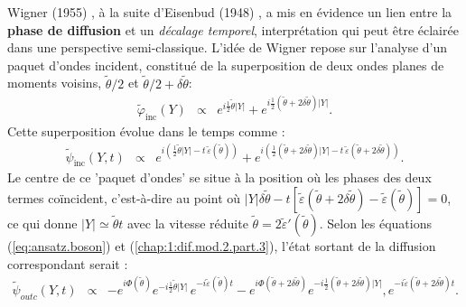 Wigner (1955) \cite{Wigner_1955}, à la suite d’Eisenbud (1948) \cite{Eisenbud:1948paa}, a mis en évidence un lien entre la {\bf phase de diffusion} et un {\em décalage temporel}, interprétation qui peut être éclairée dans une perspective semi-classique. L’idée de Wigner repose sur l’analyse d’un paquet d’ondes incident, constitué de la superposition de deux ondes planes de moments voisins, $\tilde{\theta}/2$ et $\tilde{\theta}/2 + \delta \tilde{\theta}$:
\begin{eqnarray}
	\tilde{\varphi}_{\text{inc}}(Y) & \propto & e^{i\frac{1}{2}\tilde{\theta} \vert Y\vert} + e^{i\frac{1}{2}\left(\tilde{\theta} + 2\delta \tilde{\theta} \right) \vert Y\vert}.
\end{eqnarray}
Cette superposition évolue dans le temps comme :
\begin{eqnarray}
\tilde{\psi}_{\text{inc}}(Y, t) &\propto &  e^{i\left( \frac{1}{2} \tilde{\theta}\vert Y\vert - t\,\tilde{\varepsilon}(\tilde{\theta}) \right)} + e^{i\left( \frac{1}{2}\left(  \tilde{\theta} + 2\delta \tilde{\theta} \right) \vert Y\vert - t\,\tilde{\varepsilon}(\tilde{\theta} + 2\delta \tilde{\theta}) \right)}.
\end{eqnarray}
Le centre de ce 'paquet d'ondes' se situe à la position où les phases des deux termes coïncident, c'est-à-dire au point où $\vert Y\vert\delta \tilde{\theta}  - t[\tilde{\varepsilon}(\tilde{\theta} + 2\delta \tilde{\theta} ) - \tilde{\varepsilon}(\tilde{\theta})] = 0$, ce qui donne $\vert Y\vert \simeq \tilde{\theta} t$ avec la vitesse réduite $\tilde{\theta} = 2 \tilde{\varepsilon}'(\tilde{\theta}) $. %
Selon les équations (\ref{eq:ansatz.boson}) et (\ref{chap:1:dif.mod.2.part.3}), l'état sortant de la diffusion correspondant serait :
\begin{eqnarray}
	\tilde{\psi}_{outc} ( Y, t ) & \propto & -e^{i\Phi(\tilde{\theta})}e^{-i\frac{1}{2}\tilde{\theta} \vert Y\vert}\, e^{-i \tilde{\varepsilon}(\tilde{\theta})t} - e^{i\Phi(\tilde{\theta} + 2 \delta \tilde{\theta} )}e^{-i\frac{1}{2}\left(\tilde{\theta} + 2\delta \tilde{\theta} \right) \vert Y\vert} , e^{-i \tilde{\varepsilon}(\tilde{\theta} + 2 \delta \tilde{\theta}  )t}. %
\end{eqnarray}
